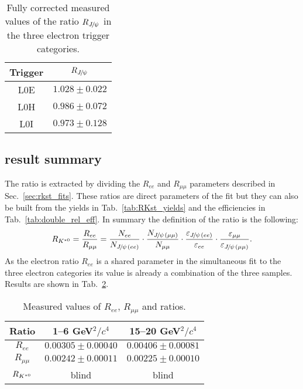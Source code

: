 \begin{table}[h!]
\centering
 \caption{Fully corrected measured values of the ratio
 $R_{\jpsi}$ in the three electron trigger categories. }
\begin{tabular}{|c|c|}
\hline
Trigger & $R_{\jpsi}$ \\
\hline
L0E  	   & $ 1.028  \pm 0.022 $ \\
L0H     & $ 0.986  \pm 0.072 $ \\
L0I      & $ 0.973  \pm 0.128 $ \\
\hline
  \end{tabular}
 \label{tab:Rjpsi}
\end{table}

\subsection{\RKst result summary}

The ratio \RKst is extracted by dividing the $R_{ee}$ and $R_{\mu\mu}$
parameters described in Sec.~\ref{sec:rkst_fits}. These ratios are 
direct parameters of the fit but they can also be built from the yields
in Tab.~\ref{tab:RKst_yields} and the efficiencies in Tab.~\ref{tab:double_rel_eff}.
In summary the definition of the \RKst ratio is the following:
%
\begin{equation}
\RKst = \frac{R_{ee}}{R_{\mu\mu}}  
= \frac{N_{ee}}{N_{\jpsi(ee)}} 
\cdot \frac{N_{\jpsi(\mu\mu)}}{N_{\mu\mu}}
\cdot \frac{\varepsilon_{\jpsi(ee)}}{\varepsilon_{ee}} 
\cdot \frac{\varepsilon_{\mu\mu}}{\varepsilon_{\jpsi(\mu\mu)}}.
\end{equation}
%
As the electron ratio $R_{ee}$ is a shared parameter in the simultaneous fit to the
three electron categories its value is already a combination of the three samples.
Results are shown in Tab.~\ref{tab:RKst_results}.

\begin{table}
\centering
 \caption{Measured values of $R_{ee}$, $R_{\mu\mu}$ and \RKst ratios.}
\begin{tabular}{|c|c|c|}
\hline
 Ratio 			& 1--6 GeV$^2/c^4$ & 15--20 GeV$^2/c^4$\\ \hline
$R_{ee}$ 	& $ 0.00305  \pm 0.00040  $ 	& $ 0.00406  \pm 0.00081 $ \\
$R_{\mu\mu}$ 	& $ 0.00242  \pm 0.00011 $ 	& $ 0.00225  \pm 0.00010 $ \\
\hline $R_{{{K}^{*0}}}$ 	& blind 	& blind  \\
\hline 
 \end{tabular}
 \label{tab:RKst_results}
\end{table}

